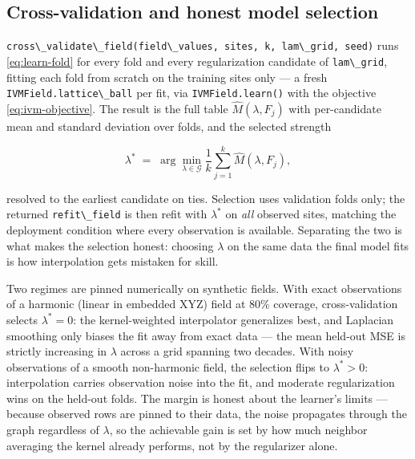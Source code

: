 \documentclass[
  10pt,
]{article}
\newcommand{\passthrough}[1]{#1}
\begin{document}
\subsection{Cross-validation and honest model
selection}\label{cross-validation-and-honest-model-selection}

\passthrough{\lstinline!cross\_validate\_field(field\_values, sites, k, lam\_grid, seed)!}
runs \eqref{eq:learn-fold} for every fold and every regularization
candidate of \passthrough{\lstinline!lam\_grid!}, fitting each fold from
scratch on the training sites only --- a fresh
\passthrough{\lstinline!IVMField.lattice\_ball!} per fit, via
\passthrough{\lstinline!IVMField.learn()!} with the objective
\eqref{eq:ivm-objective}. The result is the full table
\(\widehat{M}(\lambda, F_j)\) with per-candidate mean and standard
deviation over folds, and the selected strength

\begin{equation}
\label{eq:learn-lambda-star}
\lambda^{*} \;=\; \arg\min_{\lambda \in \mathcal{G}}
\frac{1}{k} \sum_{j=1}^{k} \widehat{M}(\lambda, F_j),
\end{equation}

resolved to the earliest candidate on ties. Selection uses validation
folds only; the returned \passthrough{\lstinline!refit\_field!} is then
refit with \(\lambda^{*}\) on \emph{all} observed sites, matching the
deployment condition where every observation is available. Separating
the two is what makes the selection honest: choosing \(\lambda\) on the
same data the final model fits is how interpolation gets mistaken for
skill.

Two regimes are pinned numerically on synthetic fields. With exact
observations of a harmonic (linear in embedded XYZ) field at 80\%
coverage, cross-validation selects \(\lambda^{*} = 0\): the
kernel-weighted interpolator generalizes best, and Laplacian smoothing
only biases the fit away from exact data --- the mean held-out MSE is
strictly increasing in \(\lambda\) across a grid spanning two decades.
With noisy observations of a smooth non-harmonic field, the selection
flips to \(\lambda^{*} > 0\): interpolation carries observation noise
into the fit, and moderate regularization wins on the held-out folds.
The margin is honest about the learner's limits --- because observed
rows are pinned to their data, the noise propagates through the graph
regardless of \(\lambda\), so the achievable gain is set by how much
neighbor averaging the kernel already performs, not by the regularizer
alone.
\end{document}

